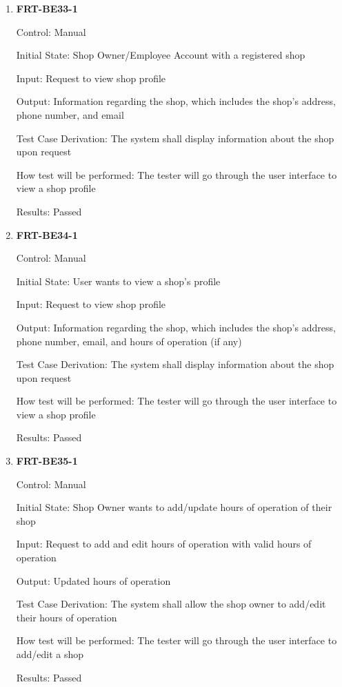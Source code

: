 \documentclass[12pt, titlepage]{article}
\begin{document}
\begin{enumerate}
	\item \textbf{FRT-BE33-1}

	      Control: Manual

	      Initial State: Shop Owner/Employee Account with a registered shop

	      Input: Request to view shop profile

	      Output: Information regarding the shop, which includes the shop's address, phone number, and email

	      Test Case Derivation: The system shall display information about the shop upon request

	      How test will be performed: The tester will go through the user interface to view a shop profile

	      Results: Passed

	\item \textbf{FRT-BE34-1}

	      Control: Manual

	      Initial State: User wants to view a shop's profile

	      Input: Request to view shop profile

	      Output: Information regarding the shop, which includes the shop's address, phone number, email, and
	      hours of operation (if any)

	      Test Case Derivation: The system shall display information about the shop upon request

	      How test will be performed: The tester will go through the user interface to view a shop profile

	      Results: Passed

	\item \textbf{FRT-BE35-1}

	      Control: Manual

	      Initial State: Shop Owner wants to add/update hours of operation of their shop

	      Input: Request to add and edit hours of operation with valid hours of operation

	      Output: Updated hours of operation

	      Test Case Derivation: The system shall allow the shop owner to add/edit their hours of operation

	      How test will be performed: The tester will go through the user interface to add/edit a shop

	      Results: Passed

\end{enumerate}
\end{document}
